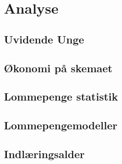 





\chapter{Analyse}

\section{Uvidende Unge}


\section{Økonomi på skemaet}


\section{Lommepenge statistik}


\section{Lommepengemodeller}


\section{Indlæringsalder}






